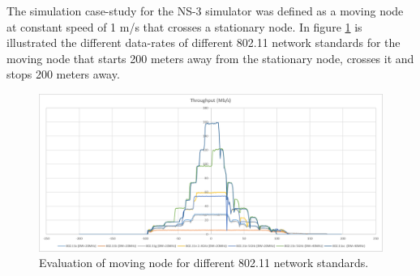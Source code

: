 The simulation case-study for the NS-3 simulator was defined as a moving node at constant speed of 1 m/s that crosses a stationary node. In figure \ref{fig:5.distance-rate} is illustrated the different data-rates of different  802.11 network standards for the moving node that starts 200 meters away from the stationary node, crosses it and stops 200 meters away.

\begin{figure}[h!]
	\centering
	\includegraphics[width=\textwidth,keepaspectratio]{figures/5.PreliminaryW/distance-rate}
	\caption{Evaluation of moving node for different 802.11 network standards.}
	\label{fig:5.distance-rate}
\end{figure}

